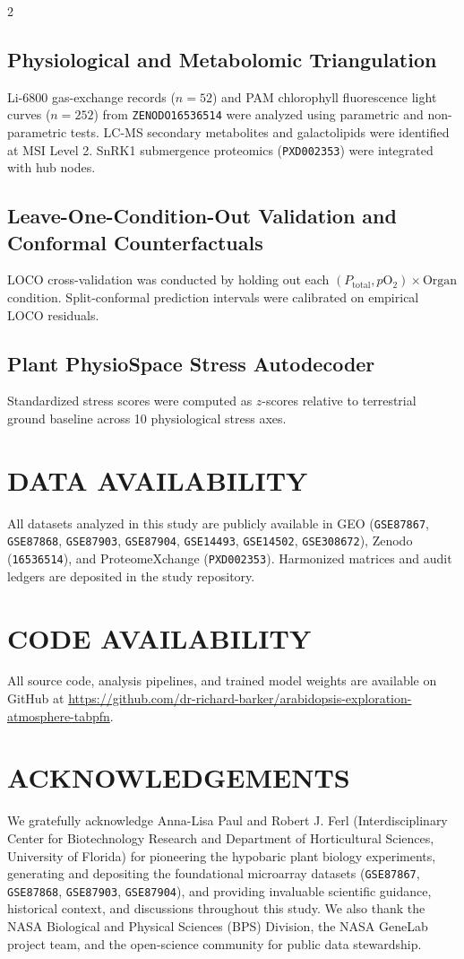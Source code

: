 \documentclass[10pt,a4paper]{article}
\begin{document}
\begin{multicols}{2}
\subsection*{Physiological and Metabolomic Triangulation}
Li-6800 gas-exchange records ($n=52$) and PAM chlorophyll fluorescence light curves ($n=252$) from \texttt{ZENODO16536514} were analyzed using parametric and non-parametric tests. LC-MS secondary metabolites and galactolipids were identified at MSI Level 2. SnRK1 submergence proteomics (\texttt{PXD002353}) were integrated with hub nodes.

\subsection*{Leave-One-Condition-Out Validation and Conformal Counterfactuals}
LOCO cross-validation was conducted by holding out each $(P_{\text{total}}, p\text{O}_2) \times \text{Organ}$ condition. Split-conformal prediction intervals were calibrated on empirical LOCO residuals.

\subsection*{Plant PhysioSpace Stress Autodecoder}
Standardized stress scores were computed as $z$-scores relative to terrestrial ground baseline across 10 physiological stress axes.

\section*{DATA AVAILABILITY}
All datasets analyzed in this study are publicly available in GEO (\texttt{GSE87867}, \texttt{GSE87868}, \texttt{GSE87903}, \texttt{GSE87904}, \texttt{GSE14493}, \texttt{GSE14502}, \texttt{GSE308672}), Zenodo (\texttt{16536514}), and ProteomeXchange (\texttt{PXD002353}). Harmonized matrices and audit ledgers are deposited in the study repository.

\section*{CODE AVAILABILITY}
All source code, analysis pipelines, and trained model weights are available on GitHub at \url{https://github.com/dr-richard-barker/arabidopsis-exploration-atmosphere-tabpfn}.

\section*{ACKNOWLEDGEMENTS}
We gratefully acknowledge Anna-Lisa Paul and Robert J. Ferl (Interdisciplinary Center for Biotechnology Research and Department of Horticultural Sciences, University of Florida) for pioneering the hypobaric plant biology experiments, generating and depositing the foundational microarray datasets (\texttt{GSE87867}, \texttt{GSE87868}, \texttt{GSE87903}, \texttt{GSE87904}), and providing invaluable scientific guidance, historical context, and discussions throughout this study. We also thank the NASA Biological and Physical Sciences (BPS) Division, the NASA GeneLab project team, and the open-science community for public data stewardship.


\end{multicols}
\end{document}
